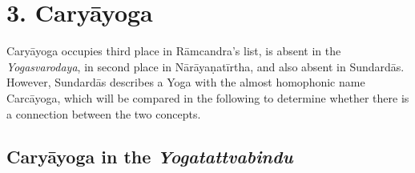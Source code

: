 
\section{3. Caryāyoga}
\label{caryayogaintro}

Caryāyoga occupies third place in Rāmcandra's list, is absent in the \textit{Yogasvarodaya}, in second place in Nārāyaṇatīrtha, and also absent in Sundardās. However, Sundardās describes a Yoga with the almost homophonic name Carcāyoga, which will be compared in the following to determine whether there is a connection between the two concepts.

\subsection{Caryāyoga in the \textit{Yogatattvabindu}}

